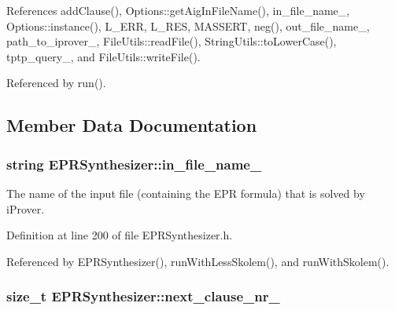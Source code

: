 References add\-Clause(), Options\-::get\-Aig\-In\-File\-Name(), in\-\_\-file\-\_\-name\-\_\-, Options\-::instance(), L\-\_\-\-E\-R\-R, L\-\_\-\-R\-E\-S, M\-A\-S\-S\-E\-R\-T, neg(), out\-\_\-file\-\_\-name\-\_\-, path\-\_\-to\-\_\-iprover\-\_\-, File\-Utils\-::read\-File(), String\-Utils\-::to\-Lower\-Case(), tptp\-\_\-query\-\_\-, and File\-Utils\-::write\-File().



Referenced by run().



\subsection{Member Data Documentation}
\hypertarget{classEPRSynthesizer_a95c4d232fec2376be891c6ddc96610ce}{
\subsubsection[{in\-\_\-file\-\_\-name\-\_\-}]{\setlength{\rightskip}{0pt plus 5cm}string E\-P\-R\-Synthesizer\-::in\-\_\-file\-\_\-name\-\_\-\hspace{0.3cm}{\ttfamily [protected]}}}\label{classEPRSynthesizer_a95c4d232fec2376be891c6ddc96610ce}


The name of the input file (containing the E\-P\-R formula) that is solved by i\-Prover. 



Definition at line 200 of file E\-P\-R\-Synthesizer.\-h.



Referenced by E\-P\-R\-Synthesizer(), run\-With\-Less\-Skolem(), and run\-With\-Skolem().

\hypertarget{classEPRSynthesizer_a14d30bb922f975a1f195965d876784cb}{
\subsubsection[{next\-\_\-clause\-\_\-nr\-\_\-}]{\setlength{\rightskip}{0pt plus 5cm}size\-\_\-t E\-P\-R\-Synthesizer\-::next\-\_\-clause\-\_\-nr\-\_\-\hspace{0.3cm}{\ttfamily [protected]}}}\label{classEPRSynthesizer_a14d30bb922f975a1f195965d876784cb}


